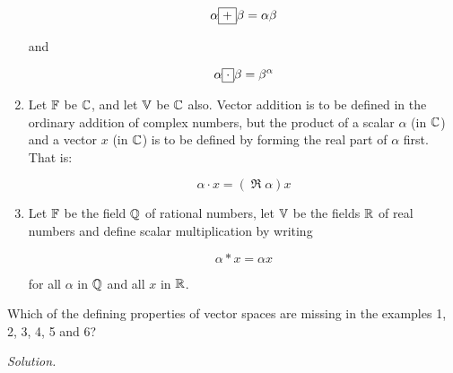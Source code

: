 \begin{enumerate}
          \begin{equation}
              \alpha \boxed{ + } \beta = \alpha\beta
          \end{equation}

          and

          \begin{equation}
              \alpha \boxed{\cdot} \beta = \beta^\alpha
          \end{equation}

    \item Let $\mathbb{F}$ be $\mathbb{C}$, and let $\mathbb{V}$ be $\mathbb{C}$ also. Vector addition is to be defined in the ordinary addition of complex numbers, but the product of a scalar $\alpha$ (in $\mathbb{C}$) and a vector $x$ (in $\mathbb{C}$) is to be defined by forming the real part of $\alpha$ first. That is:

          \begin{equation}
              \alpha \cdot x = (\operatorname{\Re} \alpha)x
          \end{equation}

    \item Let $\mathbb{F}$ be the field $\mathbb{Q}$ of rational numbers, let $\mathbb{V}$ be the fields $\mathbb{R}$ of real numbers and define scalar multiplication by writing

          \begin{equation}
              \alpha \ast x = \alpha x
          \end{equation}

          for all $\alpha$ in $\mathbb{Q}$ and all $x$ in $\mathbb{R}$.
\end{enumerate}

\begin{problem}
Which of the defining properties of vector spaces are missing in the examples 1, 2, 3, 4, 5 and 6?
\end{problem}

\textit{Solution. }



